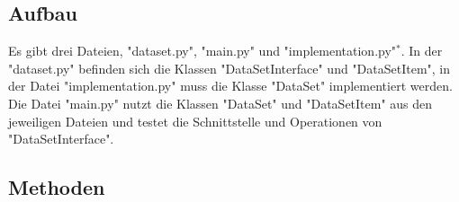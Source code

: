 \documentclass{article}
\begin{document}
		\subsection{Aufbau}

			Es gibt drei Dateien, "dataset.py", "main.py" und "implementation.py"$^*$.
			In der "dataset.py" befinden sich die Klassen "DataSetInterface" und "DataSetItem",
			in der Datei "implementation.py" muss die Klasse "DataSet" implementiert werden.
			Die Datei "main.py" nutzt die Klassen "DataSet" und "DataSetItem" aus den jeweiligen Dateien und testet die Schnittstelle und Operationen von "DataSetInterface".\\

		\subsection{Methoden}
\end{document}
